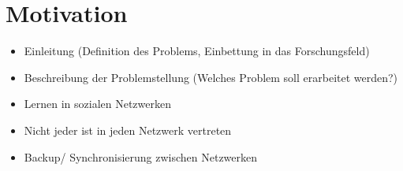 
\chapter{Motivation} %
\label{cha:motivation}

\begin{itemize}
\item Einleitung (Definition des Problems, Einbettung in das Forschungsfeld)
\item Beschreibung der Problemstellung (Welches Problem soll erarbeitet werden?)
\end{itemize}

\begin{itemize}
    \item Lernen in sozialen Netzwerken
    \item Nicht jeder ist in jeden Netzwerk vertreten
    \item Backup/ Synchronisierung zwischen Netzwerken
\end{itemize}


